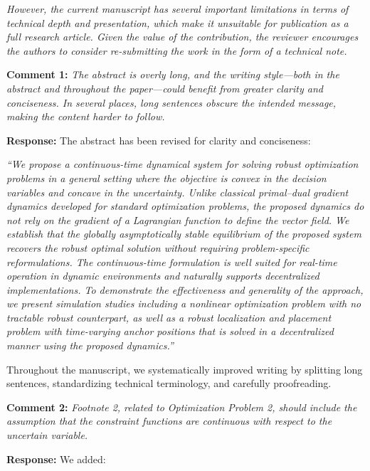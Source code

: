 \documentclass[journal,twoside,web]{ieeecolor}
\begin{document}
\vspace{0.3em}
\noindent\textit{However, the current manuscript has several important limitations in terms of technical depth and presentation, which make it unsuitable for publication as a full research article. Given the value of the contribution, the reviewer encourages the authors to consider re-submitting the work in the form of a technical note.}

\vspace{0.5em}
\noindent\textbf{Comment 1:} \textit{The abstract is overly long, and the writing style---both in the abstract and throughout the paper---could benefit from greater clarity and conciseness. In several places, long sentences obscure the intended message, making the content harder to follow.}

\noindent\textbf{Response:} The abstract has been revised for clarity and conciseness:

{\color{revisionblue}\textit{``We propose a continuous-time dynamical system for solving robust optimization problems in a general setting where the objective is convex in the decision variables and concave in the uncertainty. Unlike classical primal--dual gradient dynamics developed for standard optimization problems, the proposed dynamics do not rely on the gradient of a Lagrangian function to define the vector field. We establish that the globally asymptotically stable equilibrium of the proposed system recovers the robust optimal solution without requiring problem-specific reformulations. The continuous-time formulation is well suited for real-time operation in dynamic environments and naturally supports decentralized implementations. To demonstrate the effectiveness and generality of the approach, we present simulation studies including a nonlinear optimization problem with no tractable robust counterpart, as well as a robust localization and placement problem with time-varying anchor positions that is solved in a decentralized manner using the proposed dynamics.''}}

Throughout the manuscript, we systematically improved writing by splitting long sentences, standardizing technical terminology, and carefully proofreading.

\vspace{0.5em}
\noindent\textbf{Comment 2:} \textit{Footnote 2, related to Optimization Problem 2, should include the assumption that the constraint functions are continuous with respect to the uncertain variable.}

\noindent\textbf{Response:} We added:
\end{document}
